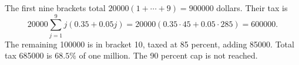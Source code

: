 The first nine brackets total $ 20000(1+\cdots+9)=900000 $ dollars. Their tax is
\[20000\sum_{j=1}^9j(0.35+0.05j)=20000(0.35\cdot45+0.05\cdot285)=600000.\]
The remaining 100000 is in bracket 10, taxed at 85 percent, adding 85000. Total tax 685000 is $\boxed{68.5\%}$ of one million. The 90 percent cap is not reached.

